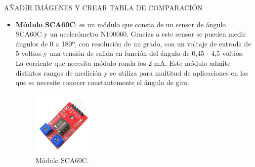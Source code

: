 AÑADIR IMÁGENES Y CREAR TABLA DE COMPARACIÓN
\begin{itemize}
    \item \textbf{Módulo SCA60C}\cite{}: es un módulo que consta de un sensor de ángulo SCA60C y un acelerómetro N100060. Gracias a este sensor se pueden medir ángulos de 0 a 180º, con resolución de un grado, con un voltaje de entrada de 5 voltios y una tensión de salida en función del ángulo de 0,45 - 4,5 voltios. La corriente que necesita módulo ronda los 2 mA. Este módulo admite distintos rangos de medición y se utiliza para multitud de aplicaciones en las que se necesite conocer constantemente el ángulo de giro. 
\begin{figure}[h!]
    \centering
    \includegraphics[width=0.3\textwidth]{img/imgSCA60C.jpg}
    \caption{Módulo SCA60C\cite{imgSCA60C}.}
    \label{fig:SCA60C} %
\end{figure}


\end{itemize}
